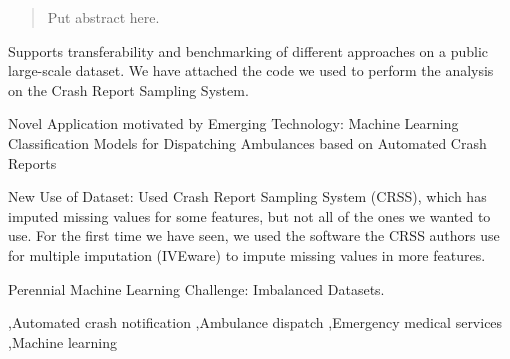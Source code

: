 \documentclass[fleqn]{cas-sc}
\begin{document}






\begin{abstract}
Put abstract here.
\vskip 1in

\end{abstract}


\begin{highlights}
	\item  Supports transferability and benchmarking of different approaches on a public large-scale dataset.  We have attached the code we used to perform the analysis on the Crash Report Sampling System.  
	\item Novel Application motivated by Emerging Technology:  Machine Learning Classification Models for Dispatching Ambulances based on Automated Crash Reports
	\item New Use of Dataset:  Used Crash Report Sampling System (CRSS), which has imputed missing values for some features, but not all of the ones we wanted to use.  For the first time we have seen, we used the software the CRSS authors use for multiple imputation (IVEware) to impute missing values in more features.  
	\item Perennial Machine Learning Challenge:  Imbalanced Datasets.
\end{highlights}

\begin{keywords}
 \sep Automated crash notification \sep Ambulance dispatch \sep Emergency medical services  \sep Machine learning
\end{keywords}
\end{document}
